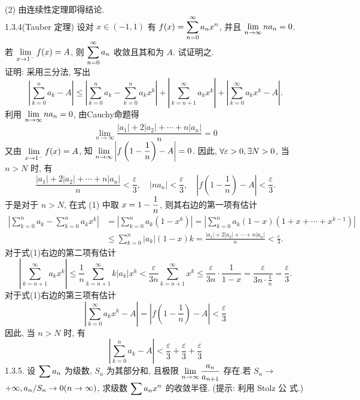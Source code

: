 \documentclass[a4paper,11pt,UTF8]{article}
\begin{document}
(2) 由连续性定理即得结论.\\
1.3.4(Tauber 定理) 设对 $x \in(-1,1)$ 有 $\displaystyle \displaystyle f(x)=\sum_{n=0}^{\infty} a_n x^n$, 并且 $\displaystyle \displaystyle \lim _{n \rightarrow \infty} n a_n=0$. 若 $\displaystyle \displaystyle \lim _{x \rightarrow 1^{-}} f(x)=A$, 则 $\displaystyle \displaystyle \sum_{n=0}^{\infty} a_n$ 收敛且其和为 $A$. 试证明之.\\
\newpage
证明: 采用三分法, 写出
$$
\left|\sum_{k=0}^n a_k-A\right| \leq\left|\sum_{k=0}^n a_k-\sum_{k=0}^n a_k x^k\right|+\left|\sum_{k=n+1}^{\infty} a_k x^k\right|+\left|\sum_{k=0}^{\infty} a_k x^k-A\right| .
$$
利用 $\displaystyle \displaystyle \lim _{n \rightarrow \infty} n a_n=0$, 由Cauchy命题得
$$
\lim _{n \rightarrow \infty} \frac{\left|a_1\right|+2\left|a_2\right|+\cdots+n\left|a_n\right|}{n}=0
$$
又由 $\displaystyle \displaystyle \lim _{x \rightarrow 1^{-}} f(x)=A$, 知 $\displaystyle \displaystyle \lim _{n \rightarrow \infty}\left|f\left(1-\frac{1}{n}\right)-A\right|=0$. 因此, $\displaystyle \displaystyle \forall \varepsilon>0, \exists N>0$, 当 $n>N$ 时, 有
$$
\frac{\left|a_1\right|+2\left|a_2\right|+\cdots+n\left|a_n\right|}{n}<\frac{\varepsilon}{3}, \quad\left|n a_n\right|<\frac{\varepsilon}{3}, \quad\left|f\left(1-\frac{1}{n}\right)-A\right|<\frac{\varepsilon}{3} .
$$
于是对于 $n>N$, 在式 (1) 中取 $\displaystyle \displaystyle x=1-\frac{1}{n}$, 则其右边的第一项有估计
$$
\begin{aligned}
	\left|\sum_{k=0}^n a_k-\sum_{k=0}^n a_k x^k\right| & =\left|\sum_{k=0}^n a_k\left(1-x^k\right)\right|=\left|\sum_{k=0}^n a_k(1-x)\left(1+x+\cdots+x^{k-1}\right)\right| \\
	& \leq \sum_{k=0}^n\left|a_k\right|(1-x) k=\frac{\left|a_1\right|+2\left|a_2\right|+\cdots+n\left|a_n\right|}{n}<\frac{\varepsilon}{3} .
\end{aligned}
$$
对于式(1)右边的第二项有估计
$$
\left|\sum_{k=n+1}^{\infty} a_k x^k\right| \leq \frac{1}{n} \sum_{k=n+1}^{\infty} k\left|a_k\right| x^k<\frac{\varepsilon}{3 n} \sum_{k=n+1}^{\infty} x^k \leq \frac{\varepsilon}{3 n} \cdot \frac{1}{1-x}=\frac{\varepsilon}{3 n \cdot \frac{1}{n}}=\frac{\varepsilon}{3} .
$$
对于式(1)右边的第三项有估计
$$
\left|\sum_{k=0}^{\infty} a_k x^k-A\right|=\left|f\left(1-\frac{1}{n}\right)-A\right|<\frac{\varepsilon}{3}
$$
因此, 当 $n>N$ 时, 有
$$
\left|\sum_{k=0}^n a_k-A\right|<\frac{\varepsilon}{3}+\frac{\varepsilon}{3}+\frac{\varepsilon}{3}
$$
1.3.5. 设 $\displaystyle \displaystyle \sum a_n$ 为级数, $S_n$ 为其部分和, 且极限 $\displaystyle \displaystyle \lim _{n \rightarrow \infty} \frac{a_n}{a_{n+1}}$ 存在.若 $S_n \rightarrow$ $+\infty,\\ a_n / S_n \rightarrow 0(n \rightarrow \infty)$, 求级数 $\displaystyle \displaystyle \sum a_n x^n$ 的收敛半径. (提示: 利用 Stolz 公 式.)\\
\end{document}
